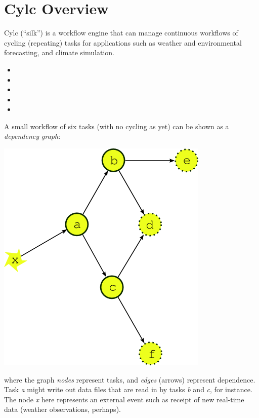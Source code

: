 \section{Cylc Overview}
\label{Cylc Overview}


Cylc (``silk'') is a workflow engine that can manage continuous workflows of
cycling (repeating) tasks for applications such as weather and environmental
forecasting, and climate simulation.

\begin{itemize}
    \item {}
    \item {}
    \item {}
    \item {}
    \item {} 
\end{itemize}

A small workflow of six tasks (with no cycling as yet) can be shown as a {\em
dependency graph}:

\begin{center}
    \includegraphics[width=0.25\columnwidth]{resources/tex/dep-one-cycle}
\end{center}

where the graph {\em nodes} represent tasks, and {\em edges} (arrows) represent
dependence.  Task {\em a} might write out data files that are read in by tasks
{\em b} and {\em c}, for instance.  The node {\em x} here represents an
external event such as receipt of new real-time data (weather observations,
perhaps).

